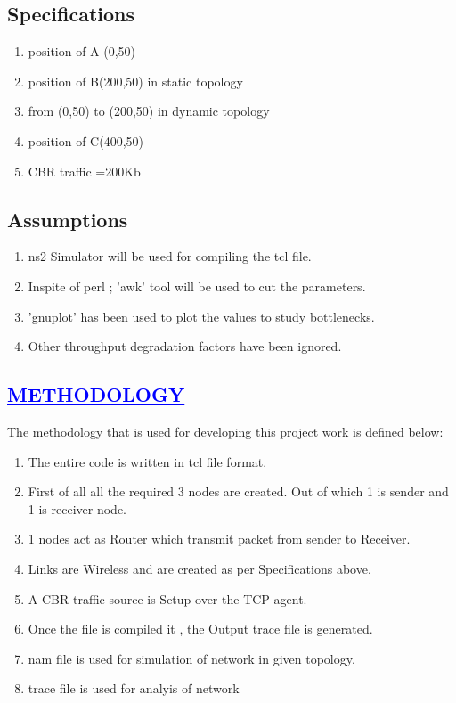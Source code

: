 \documentclass[a4paper,12pt]{report}
\begin{document}
\section*{Specifications}
\begin{enumerate}
 
 \item position of A (0,50)
 \item position of B(200,50) in static topology
\item from (0,50) to (200,50) in dynamic topology  
\item  position of C(400,50) 
 \item CBR traffic =200Kb

\end{enumerate}

\section*{Assumptions}
\begin{enumerate}
\item ns2 Simulator will be used for compiling the tcl file.
\item Inspite of perl ; 'awk' tool will be used to cut the parameters.
\item 'gnuplot' has been used to plot the values to study bottlenecks.
\item Other throughput degradation factors have been ignored.
\end{enumerate}
 
\begin{center}
\chapter{\textcolor{blue}{\underline {METHODOLOGY}}}
\end{center}
The methodology that is used for developing this project work is defined below:
\begin{enumerate} 
\item The entire code is written in tcl file format.
\item First of all all the required 3 nodes are created. Out of which 1 is sender and 1 is receiver node.
\item 1 nodes act as Router which transmit packet from sender to Receiver.
\item Links are Wireless and are created as per Specifications above.
\item A CBR  traffic source is Setup over the TCP agent.
\item Once the file is compiled it , the Output trace file is generated.
\item nam file is used for simulation of network in given topology.
\item trace file is used for analyis of network
\end{enumerate}
\end{document}

